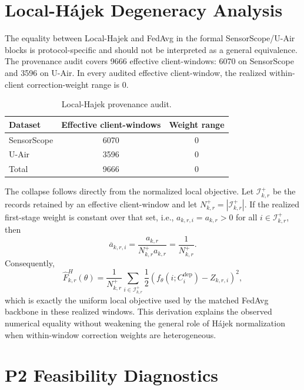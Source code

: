\documentclass[letterpaper,journal]{IEEEtran}
\begin{document}
\section{Local-H\'ajek Degeneracy Analysis}
\label{app:local_hajek}

The equality between Local-Hajek and FedAvg in the formal SensorScope/U-Air
blocks is protocol-specific and should not be interpreted as a general
equivalence.  The provenance audit covers
9666 effective client-windows: 6070 on SensorScope and
3596 on U-Air.  In every audited effective client-window, the realized
within-client correction-weight range is 0.

\begin{table}[htbp]
\centering
\caption{Local-Hajek provenance audit.}
\label{tab:app_local_hajek}
\footnotesize
\setlength{\tabcolsep}{5pt}
\begin{tabular}{lcc}
\toprule
Dataset & Effective client-windows & Weight range\\
\midrule
SensorScope & 6070 & $0$\\
U-Air & 3596 & $0$\\
\midrule
Total & 9666 & $0$\\
\bottomrule
\end{tabular}
\end{table}

The collapse follows directly from the normalized local objective.  Let
$\mathcal I_{k,r}^{+}$ be the records retained by an effective client-window
and let $N_{k,r}^{+}=|\mathcal I_{k,r}^{+}|$.  If the realized first-stage
weight is constant over that set, i.e.,
$a_{k,r,i}=a_{k,r}>0$ for all $i\in\mathcal I_{k,r}^{+}$, then
\begin{equation}
 \overline a_{k,r,i}
 =
 \frac{a_{k,r}}
 {N_{k,r}^{+}a_{k,r}}
 =
 \frac{1}{N_{k,r}^{+}}.
 \label{eq:app_local_hajek_uniform}
\end{equation}
Consequently,
\begin{equation}
 \widehat F^H_{k,r}(\theta)
 =
 \frac{1}{N_{k,r}^{+}}
 \sum_{i\in\mathcal I_{k,r}^{+}}
 \frac{1}{2}
 \left(
 f_\theta(i;C_i^{\mathrm{dep}})-Z_{k,r,i}
 \right)^2,
 \label{eq:app_local_hajek_collapse}
\end{equation}
which is exactly the uniform local objective used by the matched FedAvg
backbone in these realized windows.  This derivation explains the observed
numerical equality without weakening the general role of H\'ajek normalization
when within-window correction weights are heterogeneous.


\section{P2 Feasibility Diagnostics}
\label{app:p2_diagnostics}
\end{document}
